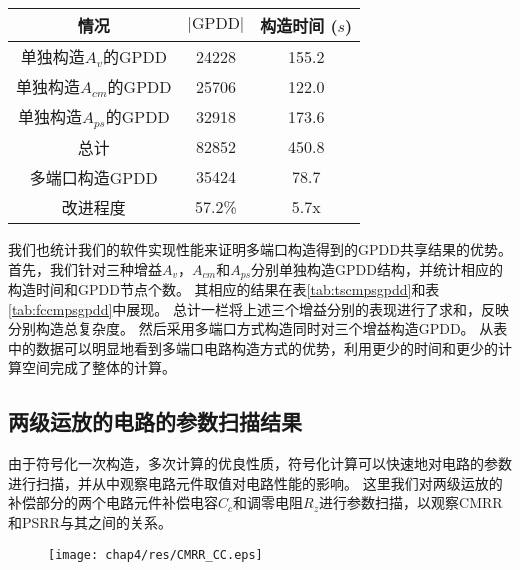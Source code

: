 \begin{table}[!htp]
	\centering
	\begin{tabular}{*{3}{c}}
		\hline
		       情况         & $|\mbox{GPDD}|$ & 构造时间 ($s$) \\ \hline
		 单独构造$A_v$的GPDD   &      24228      &   155.2    \\
		单独构造$A_{cm}$的GPDD &      25706      &   122.0    \\
		单独构造$A_{ps}$的GPDD &      32918      &   173.6    \\
		       总计         &      82852      &   450.8    \\ \hline
		    多端口构造GPDD     &      35424      &    78.7    \\ \hline
		      改进程度        &     57.2\%      &    5.7x    \\ \hline
	\end{tabular}
\end{table}

我们也统计我们的软件实现性能来证明多端口构造得到的GPDD共享结果的优势。
首先，我们针对三种增益$A_v$，$A_{cm}$和$A_{ps}$分别单独构造GPDD结构，并统计相应的构造时间和GPDD节点个数。
其相应的结果在表\ref{tab:tscmpsgpdd}和表\ref{tab:fccmpsgpdd}中展现。
总计一栏将上述三个增益分别的表现进行了求和，反映分别构造总复杂度。
然后采用多端口方式构造同时对三个增益构造GPDD。
从表中的数据可以明显地看到多端口电路构造方式的优势，利用更少的时间和更少的计算空间完成了整体的计算。

\subsection{两级运放的电路的参数扫描结果}
\label{subsec:cmps:test:MC}

由于符号化一次构造，多次计算的优良性质，符号化计算可以快速地对电路的参数进行扫描，并从中观察电路元件取值对电路性能的影响。
这里我们对两级运放的补偿部分的两个电路元件补偿电容$C_c$和调零电阻$R_z$进行参数扫描，以观察CMRR和PSRR与其之间的关系。

\begin{figure}[!htp]
	\centering
	\texttt{[image: chap4/res/CMRR\_CC.eps]}
\end{figure}

